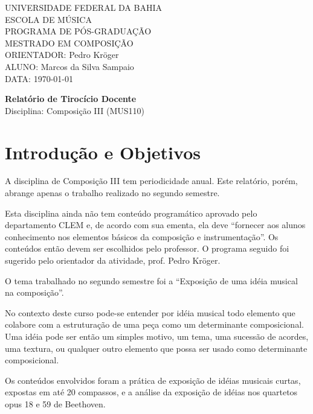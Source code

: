 \documentclass[12pt]{article}
\begin{document}
\setlength{\parindent}{0cm}
\setlength\parskip{1ex}

\large
UNIVERSIDADE FEDERAL DA BAHIA \\
ESCOLA DE MÚSICA \\
PROGRAMA DE PÓS-GRADUAÇÃO \\
MESTRADO EM COMPOSIÇÃO \\
ORIENTADOR: Pedro Kröger \\
ALUNO: Marcos da Silva Sampaio \\
DATA: \today

\thispagestyle{empty}
\vspace{1cm}
\begin{center}{
    \Huge \textbf{Relatório de Tirocício Docente} \\
}
\vspace{12pt}
{\Large Disciplina: Composição III (MUS110)}

\end{center}
\vspace{1cm}

\section{Introdução e Objetivos}
\label{sec:introducao}

A disciplina de Composição III tem periodicidade anual. Este
relatório, porém, abrange apenas o trabalho realizado no segundo
semestre.

Esta disciplina ainda não tem conteúdo programático aprovado pelo
departamento CLEM e, de acordo com sua ementa, ela deve ``fornecer aos
alunos conhecimento nos elementos básicos da composição e
instrumentação''. Os conteúdos então devem ser escolhidos pelo
professor. O programa seguido foi sugerido pelo orientador da
atividade, prof. Pedro Kröger.

O tema trabalhado no segundo semestre foi a ``Exposição de uma idéia
musical na composição''.

No contexto deste curso pode-se entender por idéia musical todo
elemento que colabore com a estruturação de uma peça como um
determinante composicional. Uma idéia pode ser então um simples
motivo, um tema, uma sucessão de acordes, uma textura, ou qualquer
outro elemento que possa ser usado como determinante composicional.

Os conteúdos envolvidos foram a prática de exposição de idéias
musicais curtas, expostas em até 20 compassos, e a análise da
exposição de idéias nos quartetos opus 18 e 59 de Beethoven.
\end{document}

